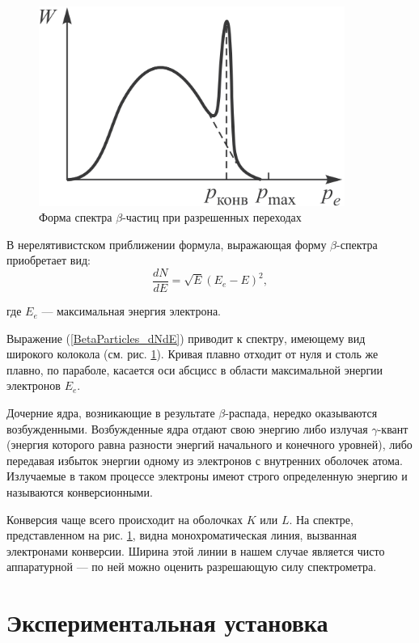 \documentclass[12pt,a4paper]{article}
\begin{document}
	\begin{figure}[h!]
		\centering
		\includegraphics[width=10cm]{res/w_p.png}
		\caption{Форма спектра $\beta$-частиц при разрешенных переходах}
		\label{BetaParticles_Spectre}
	\end{figure}

	В нерелятивистском приближении формула, выражающая форму $\beta$-спектра приобретает вид:
	\begin{equation}
		\frac{dN}{dE} = \sqrt{E}(E_e - E)^2,
		\label{BetaParticles_dNdE}
	\end{equation}

	\noindent где $E_e$ — максимальная энергия электрона.
	
	Выражение (\ref{BetaParticles_dNdE}) приводит к спектру, имеющему вид широкого колокола (см. рис. \ref{BetaParticles_Spectre}). Кривая плавно отходит от нуля и столь же плавно, по параболе, касается оси абсцисс в области максимальной энергии электронов $E_e$.
	
	
	Дочерние ядра, возникающие в результате $\beta$-распада, нередко оказываются возбужденными. Возбужденные ядра отдают свою энергию либо излучая $\gamma$-квант (энергия которого равна разности энергий начального и конечного уровней), либо передавая избыток энергии одному из электронов с внутренних оболочек атома. Излучаемые в таком процессе электроны имеют строго определенную энергию и называются конверсионными.

	Конверсия чаще всего происходит на оболочках $K$ или $L$. На спектре, представленном на рис. \ref{BetaParticles_Spectre}, видна монохроматическая линия, вызванная электронами конверсии. Ширина этой линии в нашем случае является чисто аппаратурной — по ней можно оценить разрешающую силу спектрометра.
	

    \newpage
 
	\section*{Экспериментальная установка}
\end{document}
